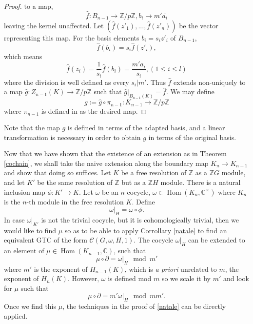 \documentclass[a4paper, 10pt]{book}
\theoremstyle{definition}
\numberwithin{equation}{chapter}
\newcommand\Hom{\operatorname{Hom}}
\newcommand\CC{\mathbb C}
\newcommand\ZZ{\mathbb Z}
\newcommand\C{\mathcal C}
\begin{document}
\begin{proof}
 to a map,
 \begin{equation}
 	\hat{f}: B_{n-1} \rightarrow \ZZ/p\ZZ, b_i\mapsto  m'\bar{a_i}
 \end{equation}
leaving the kernel unaffected.  Let $(\hat{f}(z'_1), ..., \hat{f}(z'_n))$ be the vector representing this map.  For the basis elements $b_i = s_iz'_i$ of $B_{n-1}$,
\begin{equation}
	 \hat{f}(b_i)= s_i\hat{f}(z'_i),
\end{equation}
which means \begin{equation}
	\hat{f}(z_i) = \frac{1}{s_i}\hat{f}(b_i) = \frac{m' a_i}{ s_i} ,(1\leq i\leq l)
\end{equation}
where the division is well defined as every $s_i|m'$. Thus $\hat{f}$ extends non-uniquely to a map $\hat{g}:Z_{n-1}(K)\rightarrow \ZZ/p\ZZ$ such that $\hat{g}|_{B_{n-1}(K)} = \hat{f}$.  We may define \begin{equation}
	g:= \hat{g}\circ \pi_{n-1}: K_{n-1} \rightarrow \ZZ/p\ZZ   
\end{equation}
where $\pi_{n-1}$ is defined in as the desired map.\end{proof}
Note that the map $g$ is defined in terms of the adapted basis, and a linear transformation is necessary in order to obtain $g$ in terms of the original basis.

Now that we have shown that the existence of an extension as in Theorem \ref{cochain}, we shall take the naive extension along the boundary map $K_n\rightarrow K_{n-1}$ and show that doing so suffices. 
Let $K$ be a free resolution of $\ZZ$ as a $\ZZ G$ module, and let $K'$ be the same resolution of $\ZZ$ but as a $\ZZ H$ module. There is a natural inclusion map $\phi:K'\rightarrow K$. Let $\omega$ be an $n$-cocycle, $\omega\in \Hom(K_n, \CC^\times)$ where $K_n$ is the $n$-th module in the free resolution $K$. Define \begin{equation}
	\omega|_{H} = \omega\circ \phi.
\end{equation} In case $\omega|_{K'}$ is not the trivial cocycle, but it is cohomologically trivial, then we would like to find $\mu$ so as to be able to apply Corrollary \ref{natale} to find an equivalent GTC of the form $\C(G, \omega, H, 1)$. The cocycle $\omega|_H$ can be extended to an element of $\mu \in \Hom(K_{n-1}, \CC)$, such that \begin{equation}
	\mu\circ\partial = \omega|_H \mod m'
\end{equation} where $m'$ is the exponent of $H_{n-1}(K)$, which is \textit{a priori} unrelated to $m$, the exponent of $H_n(K)$. However, $\omega$ is defined mod $m$ so we scale it by $m'$ and look for $\mu$ such that \begin{equation}
	\mu\circ\partial = m'\omega|_H \mod mm'.
\end{equation}
Once we find this $\mu$, the techniques in the proof of \ref{natale} can be directly applied.
\end{document}
